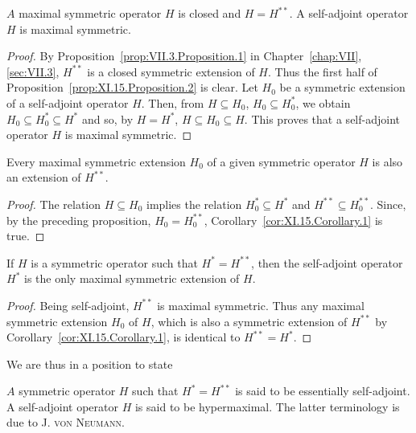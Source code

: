 \begin{proposition}\label{prop:XI.15.Proposition.2} $A$ maximal symmetric operator $H$ is closed and $H = H^{**}$. A self-adjoint operator $H$ is maximal symmetric. 
\end{proposition}

\begin{proof}
 By Proposition~\ref{prop:VII.3.Proposition.1} in Chapter~\ref{chap:VII}, \ref{sec:VII.3}, $H^{**}$ is a closed symmetric extension of $H$. Thus the first half of Proposition~\ref{prop:XI.15.Proposition.2} is clear. Let $H_0$ be a symmetric extension of a self-adjoint operator $H$. Then, from $H \subseteq H_0$, $H_0 \subseteq H_0^*$, we obtain $H_0 \subseteq H_0^* \subseteq H^*$ and so, by $H = H^*$, $H \subseteq H_0 \subseteq H$. This proves that a self-adjoint operator $H$ is maximal symmetric. 
\end{proof}

\begin{corollary}\label{cor:XI.15.Corollary.1} Every maximal symmetric extension $H_0$ of a given symmetric operator $H$ is also an extension of $H^{**}$. 
\end{corollary}

\begin{proof}
 The relation $H \subseteq H_0$ implies the relation $H_0^* \subseteq H^*$ and $H^{**} \subseteq H_0^{**}$. Since, by the preceding proposition, $H_0 = H_0^{**}$, Corollary~\ref{cor:XI.15.Corollary.1} is true. 
\end{proof}

\begin{corollary}\label{cor:XI.15.Corollary.2} If $H$ is a symmetric operator such that $H^{*} = H^{**}$, then the self-adjoint operator $H^{*}$ is the only maximal symmetric extension of $H$. 
\end{corollary}

\begin{proof}
 Being self-adjoint, $H^{**}$ is maximal symmetric. Thus any maximal symmetric extension $H_{0}$ of $H$, which is also a symmetric extension of $H^{**}$ by Corollary~\ref{cor:XI.15.Corollary.1}, is identical to $H^{**} = H^{*}$. 
\end{proof}

We are thus in a position to state 

\begin{definition}\label{def:XI.15.Definition.3} $A$ symmetric operator $H$ such that $H^{*} = H^{**}$ is said to be essentially self-adjoint. A self-adjoint operator $H$ is said to be hypermaximal. The latter terminology is due to J. \textsc{von} \textsc{Neumann}. 
\end{definition}

